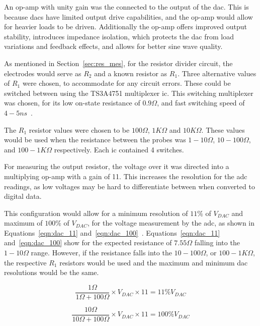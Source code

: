 An op-amp with unity gain was the connected to the output of the \gls{dac}.
This is because \gls{dac}s have limited output drive capabilities, and the op-amp would allow for heavier loads to be driven.
Additionally the op-amp offers improved output stability, introduces impedance isolation, which protects the \gls{dac} from load variations and feedback effects, and allows for better sine wave quality.

As mentioned in Section~\ref{sec:res_mes}, for the resistor divider circuit, the electrodes would serve as $R_2$ and a known resistor as $R_1$.
Three alternative values of $R_1$ were chosen, to accommodate for any circuit errors.
These could be switched between using the TS3A4751 multiplexer \gls{ic}.
This switching multiplexer was chosen, for its low on-state resistance of $0.9\Omega$, and fast switching speed of $4-5ns$~\cite{cam_clark}.

The $R_1$ resistor values were chosen to be $100\Omega$, $1K\Omega$ and $10K\Omega$.
These values would be used when the resistance between the probes was $1-10\Omega$, $10-100\Omega$, and $100-1K\Omega$ respectively.
Each \gls{ic} contained 4 switches.

For measuring the output resistor, the voltage over it was directed into a multiplying op-amp with a gain of 11.
This increases the resolution for the \gls{adc} readings, as low voltages may be hard to differentiate between when converted to digital data. 

This configuration would allow for a minimum resolution of $11\%$ of $V_{DAC}$ and maximum of $100\%$ of $V_{DAC}$, for the voltage measurement by the \gls{adc}, as shown in Equations~\ref{eqn:dac_11} and~\ref{eqn:dac_100}~\cite{cam_clark}.
Equations~\ref{eqn:dac_11} and~\ref{eqn:dac_100} show for the expected resistance of $7.55\Omega$ falling into the $1-10\Omega$ range.
However, if the resistance falls into the $10-100\Omega$, or $100-1K\Omega$, the respective $R_1$ resistors would be used and the maximum and minimum \gls{dac} resolutions would be the same.

\begin{equation}\label{eqn:dac_11}
    \frac{1\Omega}{1\Omega + 100\Omega}\times V_{DAC} \times 11 = 11\% V_{DAC}
\end{equation}

\begin{equation}\label{eqn:dac_100}
    \frac{10\Omega}{10\Omega + 100\Omega}\times V_{DAC} \times 11 = 100\% V_{DAC}
\end{equation}

